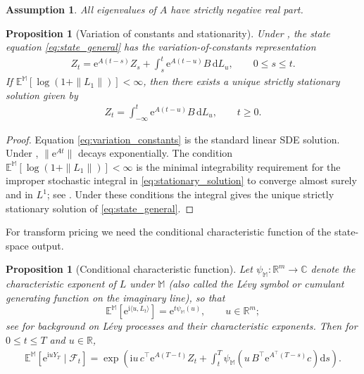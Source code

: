 \documentclass[10pt,reqno]{amsart}
\newtheorem{proposition}[theorem]{Proposition}
\newtheorem{assumption}[theorem]{Assumption}
\newcommand{\R}{\mathbb{R}}
\newcommand{\C}{\mathbb{C}}
\newcommand{\E}{\mathbb{E}}
\newcommand{\F}{\mathcal{F}}
\newcommand{\1}{\mathbbm{1}}
\newcommand{\dd}{\mathrm{d}}
\newcommand{\ii}{\mathrm{i}}
\newcommand{\ee}{\mathrm{e}}
\begin{document}
\begin{assumption}\label{ass:stableA}
All eigenvalues of $A$ have strictly negative real part.
\end{assumption}

\begin{proposition}[Variation of constants and stationarity]
\label{prop:variation_constants}
Under , the state equation \eqref{eq:state_general} has the
variation-of-constants representation
\begin{align}\label{eq:variation_constants}
  Z_t = \ee^{A(t-s)} Z_s + \int_s^t \ee^{A(t-u)} B\,\dd L_u,
  \qquad 0 \le s \le t.
\end{align}
If $\mathbb{E}^{\mathbb{M}}[\log(1+\|L_1\|)] < \infty$, then there exists a
unique strictly stationary solution given by
\begin{align}\label{eq:stationary_solution}
  Z_t = \int_{-\infty}^t \ee^{A(t-u)} B\,\dd L_u,
  \qquad t \ge 0.
\end{align}
\end{proposition}

\begin{proof}
Equation \eqref{eq:variation_constants} is the standard linear SDE solution.
Under , $\|\ee^{At}\|$ decays exponentially. The condition
$\mathbb{E}^{\mathbb{M}}[\log(1+\|L_1\|)] < \infty$ is the minimal
integrability requirement for the improper stochastic integral in
\eqref{eq:stationary_solution} to converge almost surely and in $L^1$;
see \citet{Bro01}. Under these conditions the integral gives the unique strictly
stationary solution of \eqref{eq:state_general}.
\end{proof}

For transform pricing we need the conditional characteristic function of the
state-space output.

\begin{proposition}[Conditional characteristic function]
\label{prop:cf_single_factor}
Let $\psi_{\mathbb{M}}:\R^m \to \C$ denote the characteristic exponent of
$L$ under $\mathbb{M}$ (also called the Lévy symbol or cumulant generating
function on the imaginary line), so that
$$
\E^{\mathbb{M}}\!\left[\ee^{\ii\langle u,L_t\rangle}\right]
= \ee^{t\psi_{\mathbb{M}}(u)},\qquad u \in \R^m;
$$
see \citet{Con04} for background on Lévy processes and their characteristic
exponents.
Then for $0 \le t \le T$ and $u \in \R$,
\begin{align}\label{eq:single_factor_cf}
  \E^{\mathbb{M}}\!\left[\ee^{\ii u Y_T}\mid \F_t\right]
  = \exp\!\left(
      \ii u\, c^\top \ee^{A(T-t)} Z_t
      + \int_t^T \psi_{\mathbb{M}}\!\left(
          u\, B^\top \ee^{A^\top(T-s)} c
        \right)\dd s
    \right).
\end{align}
\end{proposition}
\end{document}
